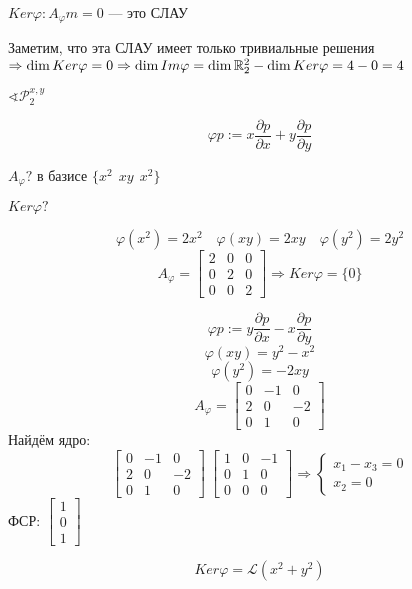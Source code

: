 \begin{example}
    $Ker\varphi : A_\varphi m=0$ --- это СЛАУ

    Заметим, что эта СЛАУ имеет только тривиальные решения $\Rightarrow \dim Ker \varphi =0 \Rightarrow \dim Im \varphi = \dim \mathbb{R}_2^2 - \dim Ker \varphi = 4 - 0 = 4$
\end{example}

\begin{example}
    $\sphericalangle \mathcal{P}^{x,y}_2$

    $$\varphi p := x\frac{\partial p}{\partial x} + y\frac{\partial p}{\partial y}$$

    $A_\varphi?$ в базисе $\{x^2 \ \ xy \ \ x^2\}$

    $Ker \varphi?$

    $$\varphi(x^2)=2x^2 \quad \varphi(xy) = 2xy \quad \varphi(y^2)=2y^2$$
    $$A_\varphi=\begin{bmatrix}
            2 & 0 & 0 \\
            0 & 2 & 0 \\
            0 & 0 & 2
        \end{bmatrix} \Rightarrow Ker \varphi = \{0\}$$
\end{example}

\begin{example}
    $$\varphi p := y\frac{\partial p}{\partial x} - x\frac{\partial p}{\partial y}$$
    $$\varphi(xy) = y^2-x^2$$
    $$\varphi(y^2) = -2xy$$
    $$A_\varphi = \begin{bmatrix}
            0 & -1 & 0  \\
            2 & 0  & -2 \\
            0 & 1  & 0
        \end{bmatrix}$$
    Найдём ядро:
    $$\begin{bmatrix}
            0 & -1 & 0  \\
            2 & 0  & -2 \\
            0 & 1  & 0
        \end{bmatrix} ~ \begin{bmatrix}
            1 & 0 & -1 \\
            0 & 1 & 0  \\
            0 & 0 & 0
        \end{bmatrix} \Rightarrow \begin{cases}
            x_1 - x_3 = 0 \\
            x_2 = 0
        \end{cases}$$
    ФСР: $\begin{bmatrix}
            1 \\ 0 \\ 1
        \end{bmatrix}$

    $$Ker \varphi = \mathscr{L}(x^2+y^2)$$
\end{example}


